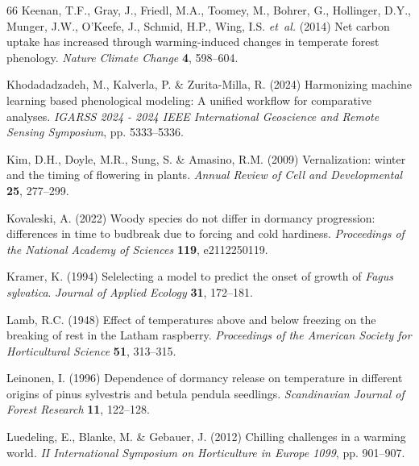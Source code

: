 \documentclass[11pt]{article}
\begin{document}
\begin{thebibliography}{66}
Keenan, T.F., Gray, J., Friedl, M.A., Toomey, M., Bohrer, G., Hollinger, D.Y.,
  Munger, J.W., O'Keefe, J., Schmid, H.P., Wing, I.S. \emph{et~al.} (2014) Net
  carbon uptake has increased through warming-induced changes in temperate
  forest phenology. \emph{Nature Climate Change} \textbf{4}, 598--604.

Khodadadzadeh, M., Kalverla, P. \& Zurita-Milla, R. (2024) Harmonizing machine
  learning based phenological modeling: A unified workflow for comparative
  analyses. \emph{IGARSS 2024 - 2024 IEEE International Geoscience and Remote
  Sensing Symposium}, pp. 5333--5336.

Kim, D.H., Doyle, M.R., Sung, S. \& Amasino, R.M. (2009) Vernalization: winter
  and the timing of flowering in plants. \emph{Annual Review of Cell and
  Developmental} \textbf{25}, 277--299.

Kovaleski, A. (2022) Woody species do not differ in dormancy progression:
  differences in time to budbreak due to forcing and cold hardiness.
  \emph{Proceedings of the National Academy of Sciences} \textbf{119},
  e2112250119.

Kramer, K. ({1994}) {Selelecting a model to predict the onset of growth of
  \emph{Fagus sylvatica}}. \emph{Journal of Applied Ecology} \textbf{{31}},
  {172--181}.

Lamb, R.C. (1948) {Effect of temperatures above and below freezing on the
  breaking of rest in the Latham raspberry}. \emph{{Proceedings of the American
  Society for Horticultural Science}} \textbf{51}, 313--315.

Leinonen, I. (1996) Dependence of dormancy release on temperature in different
  origins of pinus sylvestris and betula pendula seedlings. \emph{Scandinavian
  Journal of Forest Research} \textbf{11}, 122--128.

Luedeling, E., Blanke, M. \& Gebauer, J. (2012) Chilling challenges in a
  warming world. \emph{II International Symposium on Horticulture in Europe
  1099}, pp. 901--907.


\end{thebibliography}
\end{document}
